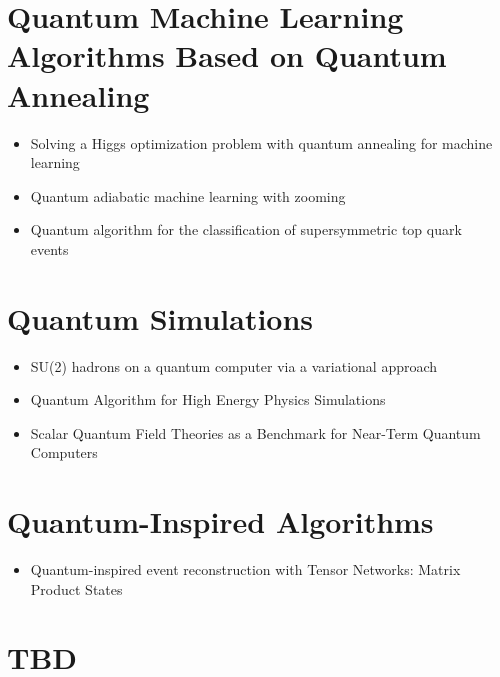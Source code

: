 \section{Quantum Machine Learning Algorithms Based on Quantum Annealing}

\begin{itemize}
   \item Solving a Higgs optimization problem with quantum annealing for machine learning~\cite{Mott:2017xdb}
   \item Quantum adiabatic machine learning with zooming~\cite{Zlokapa:2019lvv}
   \item Quantum algorithm for the classification of supersymmetric top quark events~\cite{Bargassa:2021jmk}
\end{itemize}


\section{Quantum Simulations}

\begin{itemize}
   \item SU(2) hadrons on a quantum computer via a variational approach~\cite{Atas:2021ext}
   \item Quantum Algorithm for High Energy Physics Simulations~\cite{Bauer:2019qxa}
   \item Scalar Quantum Field Theories as a Benchmark for Near-Term Quantum Computers~\cite{Yeter-Aydeniz:2018mix}
\end{itemize}


\section{Quantum-Inspired Algorithms}

\begin{itemize}
   \item Quantum-inspired event reconstruction with Tensor Networks: Matrix Product States~\cite{Araz:2021zwu}
\end{itemize}


\section{TBD}

